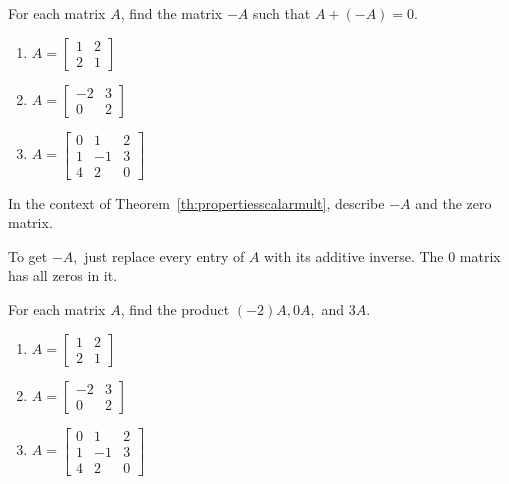 \documentclass{ximera}
\begin{document}
\begin{problem}\label{prb:4.2} For each matrix $A$, find the matrix $-A$ such that $A + (-A) = 0$.
\begin{enumerate}
\item
$A = \left[ \begin{array}{rr}
1 & 2 \\
2 & 1
\end{array} \right]$

\item
$A = \left[ \begin{array}{rr}
-2 & 3 \\
0 & 2
\end{array} \right]$

\item
$A = \left[ \begin{array}{rrr}
0 & 1 & 2 \\
1 & -1 & 3 \\
4 & 2 & 0
\end{array} \right]$
\end{enumerate}
\end{problem}

\begin{problem}\label{prb:4.3} In the context of Theorem~\ref{th:propertiesscalarmult}, describe $-A$ and the zero matrix.

\begin{hint}
To get $-A,$ just
replace every entry of $A$ with its additive inverse. The 0 matrix has all zeros in it.
\end{hint}
\end{problem}

\begin{problem}\label{prb:4.4} For each matrix $A$, find the product $(-2)A, 0A,$ and $3A$.
\begin{enumerate}
\item
$A = \left[ \begin{array}{rr}
1 & 2 \\
2 & 1
\end{array} \right]$

\item
$A = \left[ \begin{array}{rr}
-2 & 3 \\
0 & 2
\end{array} \right]$

\item
$A = \left[ \begin{array}{rrr}
0 & 1 & 2 \\
1 & -1 & 3 \\
4 & 2 & 0
\end{array} \right]$
\end{enumerate}
\end{problem}
\end{document}
